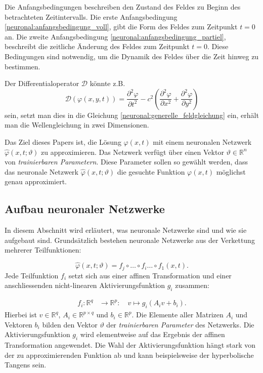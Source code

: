 Die Anfangsbedingungen beschreiben den Zustand des Feldes zu Beginn des betrachteten Zeitintervalls.
Die erste Anfangsbedingung \eqref{neuronal:anfangsbedingung_voll}, gibt die Form des Feldes zum Zeitpunkt $t = 0$ an.
Die zweite Anfangsbedingung \eqref{neuronal:anfangsbedingung_partiel}, beschreibt die zeitliche Änderung des Feldes zum Zeitpunkt $t = 0$.
Diese Bedingungen sind notwendig, um die Dynamik des Feldes über die Zeit hinweg zu bestimmen.

Der Differentialoperator $\mathcal{D}$ könnte z.B. 
\begin{equation}
    \mathcal{D}(\varphi(x, y, t)) = \frac{\partial^2 \varphi}{\partial t^2} - c^2 \left( \frac{\partial^2 \varphi}{\partial x^2} + \frac{\partial^2 \varphi}{\partial y^2} \right)
    \label{neuronal:bsp_differentialoperator}
\end{equation}
sein, setzt man dies in die Gleichung \eqref{neuronal:generelle_feldgleichung} ein, erhält man die Wellengleichung in zwei Dimensionen.

Das Ziel dieses Papers ist, die Lösung $\varphi(x, t)$ mit einem neuronalen Netzwerk $\hat{\varphi}(x, t; \vartheta)$ zu approximieren.
Das Netzwerk verfügt über einen Vektor \( \vartheta \in \mathbb{R}^n \) von \emph{trainierbaren Parametern}.
%
Diese Parameter sollen so gewählt werden, dass das neuronale Netzwerk $\hat{\varphi}(x, t; \vartheta)$ die gesuchte Funktion $\varphi(x, t)$ möglichst genau approximiert.

\subsection{Aufbau neuronaler Netzwerke}\label{neuronal:subsection:struktur_nn}
In diesem Abschnitt wird erläutert, was neuronale Netzwerke sind und wie sie aufgebaut sind.
Grundsätzlich bestehen neuronale Netzwerke aus der Verkettung mehrerer Teilfunktionen:

\begin{equation}
    \hat{\varphi}(x, t; \vartheta) = f_j \circ \ldots \circ f_i \ldots \circ f_1(x, t).
    \label{neuronal:nn_ausformuliert}
\end{equation}
Jede Teilfunktion \( f_i \) setzt sich aus einer affinen Transformation und einer anschliessenden nicht-linearen Aktivierungsfunktion \( g_i \) zusammen:

\begin{align*}
    f_i\colon \mathbb{R}^q & \longrightarrow \mathbb{R}^p \colon \quad v \longmapsto g_i(A_i v + b_i).
\end{align*}
Hierbei ist \( v \in \mathbb{R}^q \), \( A_i \in \mathbb{R}^{p \times q} \) und \( b_i \in \mathbb{R}^p \). 
Die Elemente aller Matrizen \( A_i \) und Vektoren \( b_i \) bilden den Vektor \( \vartheta \) der \emph{trainierbaren Parameter} des Netzwerks.
Die Aktivierungsfunktion \( g_i \) wird elementweise auf das Ergebnis der affinen Transformation angewendet.
Die Wahl der Aktivierungsfunktion hängt stark von der zu approximierenden Funktion ab und kann beispielsweise der hyperbolische Tangens sein.


